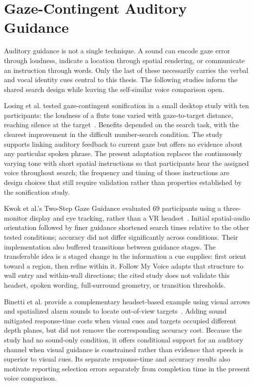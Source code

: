 \section{Gaze-Contingent Auditory Guidance}
Auditory guidance is not a single technique. A sound can encode gaze error through loudness, indicate a location through spatial rendering, or communicate an instruction through words. Only the last of these necessarily carries the verbal and vocal identity cues central to this thesis. The following studies inform the shared search design while leaving the self-similar voice comparison open.

Losing et al. tested gaze-contingent sonification in a small desktop study with ten participants: the loudness of a flute tone varied with gaze-to-target distance, reaching silence at the target~\cite{losing2014guiding}. Benefits depended on the search task, with the clearest improvement in the difficult number-search condition. The study supports linking auditory feedback to current gaze but offers no evidence about any particular spoken phrase. The present adaptation replaces the continuously varying tone with short spatial instructions so that participants hear the assigned voice throughout search; the frequency and timing of those instructions are design choices that still require validation rather than properties established by the sonification study.

Kwok et al.'s Two-Step Gaze Guidance evaluated 69 participants using a three-monitor display and eye tracking, rather than a VR headset~\cite{kwok2022twostep}. Initial spatial-audio orientation followed by finer guidance shortened search times relative to the other tested conditions; accuracy did not differ significantly across conditions. Their implementation also buffered transitions between guidance stages. The transferable idea is a staged change in the information a cue supplies: first orient toward a region, then refine within it. Follow My Voice adapts that structure to wall entry and within-wall directions; the cited study does not validate this headset, spoken wording, full-surround geometry, or transition thresholds.

Binetti et al. provide a complementary headset-based example using visual arrows and spatialized alarm sounds to locate out-of-view targets~\cite{binetti2021outofview}. Adding sound mitigated response-time costs when visual cues and targets occupied different depth planes, but did not remove the corresponding accuracy cost. Because the study had no sound-only condition, it offers conditional support for an auditory channel when visual guidance is constrained rather than evidence that speech is superior to visual cues. Its separate response-time and accuracy results also motivate reporting selection errors separately from completion time in the present voice comparison.

